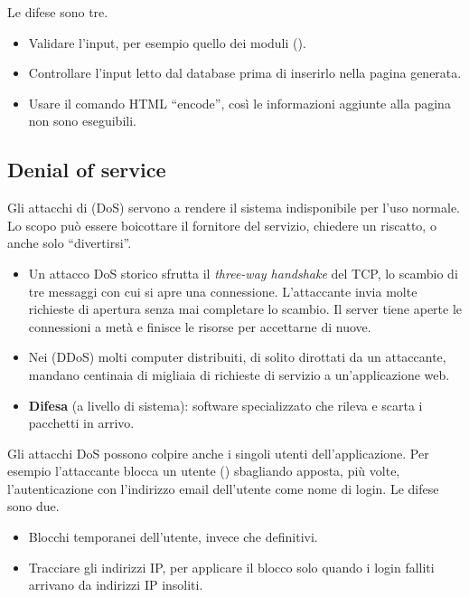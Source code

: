 Le difese sono tre.
\begin{itemize}
  \item Validare l'input, per esempio quello dei moduli ().
  \item Controllare l'input letto dal database prima di inserirlo nella pagina generata.
  \item Usare il comando HTML ``encode'', così le informazioni aggiunte alla pagina non sono eseguibili.
\end{itemize}

\subsection{Denial of service}
\label{sec:sic-dos}

Gli attacchi di  (DoS) servono a rendere il sistema indisponibile per l'uso normale. Lo
scopo può essere boicottare il fornitore del servizio, chiedere un riscatto, o anche solo ``divertirsi''.

\begin{itemize}
  \item Un attacco DoS storico sfrutta il \emph{three-way handshake} del TCP, lo scambio di tre messaggi con cui si
    apre una connessione. L'attaccante invia molte richieste di apertura senza mai completare lo scambio. Il server
    tiene aperte le connessioni a metà e finisce le risorse per accettarne di nuove.
  \item Nei  (DDoS) molti computer distribuiti, di solito dirottati da un attaccante, mandano
    centinaia di migliaia di richieste di servizio a un'applicazione web.
  \item \textbf{Difesa} (a livello di sistema): software specializzato che rileva e scarta i pacchetti in arrivo.
\end{itemize}

Gli attacchi DoS possono colpire anche i singoli utenti dell'applicazione. Per esempio l'attaccante blocca un utente
() sbagliando apposta, più volte, l'autenticazione con l'indirizzo email dell'utente come nome di
login. Le difese sono due.
\begin{itemize}
  \item Blocchi temporanei dell'utente, invece che definitivi.
  \item Tracciare gli indirizzi IP, per applicare il blocco solo quando i login falliti arrivano da indirizzi IP
    insoliti.
\end{itemize}

